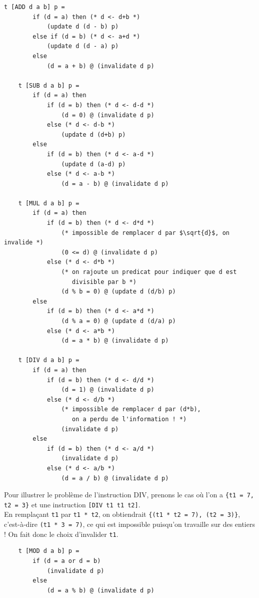 \documentclass[french]{article}
\begin{document}
  \begin{lstlisting}[mathescape]
    t [ADD d a b] p =
        if (d = a) then (* d <- d+b *)
            (update d (d - b) p)
        else if (d = b) (* d <- a+d *)
            (update d (d - a) p)
        else
            (d = a + b) @ (invalidate d p)

    t [SUB d a b] p =
        if (d = a) then
            if (d = b) then (* d <- d-d *)
                (d = 0) @ (invalidate d p)
            else (* d <- d-b *)
                (update d (d+b) p)
        else
            if (d = b) then (* d <- a-d *)
                (update d (a-d) p)
            else (* d <- a-b *)
                (d = a - b) @ (invalidate d p)

    t [MUL d a b] p =
        if (d = a) then
            if (d = b) then (* d <- d*d *)
                (* impossible de remplacer d par $\sqrt{d}$, on invalide *)
                (0 <= d) @ (invalidate d p)
            else (* d <- d*b *)
                (* on rajoute un predicat pour indiquer que d est
                   divisible par b *)
                (d % b = 0) @ (update d (d/b) p)
        else
            if (d = b) then (* d <- a*d *)
                (d % a = 0) @ (update d (d/a) p)
            else (* d <- a*b *)
                (d = a * b) @ (invalidate d p)

    t [DIV d a b] p =
        if (d = a) then
            if (d = b) then (* d <- d/d *)
                (d = 1) @ (invalidate d p)
            else (* d <- d/b *)
                (* impossible de remplacer d par (d*b),
                   on a perdu de l'information ! *)
                (invalidate d p)
        else
            if (d = b) then (* d <- a/d *)
                (invalidate d p)
            else (* d <- a/b *)
                (d = a / b) @ (invalidate d p)
  \end{lstlisting}

  Pour illustrer le problème de l'instruction DIV, prenons le cas où l'on a \texttt{\{t1 = 7, t2 = 3\}} et une instruction \texttt{[DIV t1 t1 t2]}.\\
  En remplaçant \texttt{t1} par \texttt{t1 * t2}, on obtiendrait \texttt{\{(t1 * t2 = 7), (t2 = 3)\}}, c'est-à-dire \texttt{(t1 * 3 = 7)}, ce qui est impossible puisqu'on travaille sur des entiers ! On fait donc le choix d'invalider \texttt{t1}.

  \begin{lstlisting}
    t [MOD d a b] p =
        if (d = a or d = b)
            (invalidate d p)
        else
            (d = a % b) @ (invalidate d p)
  \end{lstlisting}
\end{document}
